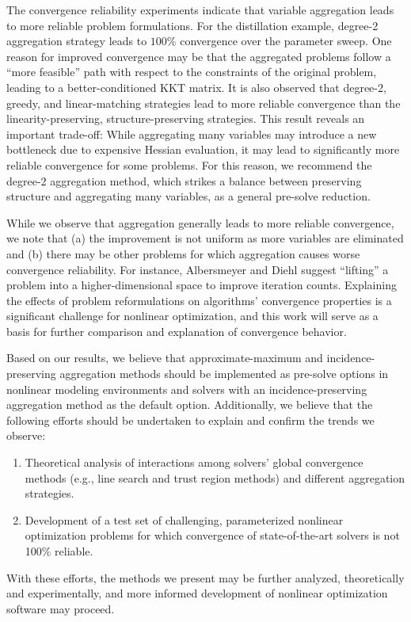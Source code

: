 \documentclass[smallextended]{svjour3}
\newcommand{\rev}[1]{{#1}}
\begin{document}
The convergence reliability experiments indicate that variable aggregation leads to more
reliable problem formulations. For the distillation example, degree-2 aggregation
strategy leads to $100 \%$ convergence over the parameter sweep.
One reason for improved convergence may be that the aggregated problems follow a ``more
feasible'' path with respect to the constraints of the original problem,
leading to a better-conditioned KKT matrix.
It is also observed that degree-2, greedy, and linear-matching strategies lead
to more reliable convergence than the linearity-preserving, structure-preserving
strategies.
This result reveals an important trade-off: While aggregating many variables may
introduce a new bottleneck due to expensive Hessian evaluation, it may lead to
significantly more reliable convergence for some problems. For this reason,
we recommend the degree-2 aggregation method, which strikes a balance between
preserving structure and aggregating many variables, as a general pre-solve reduction.

While we observe that aggregation generally leads to more reliable convergence, we note
that (a) the improvement is not uniform as more variables are eliminated and (b) there
may be other problems for which aggregation causes worse convergence reliability.
For instance, Albersmeyer and Diehl \cite{albersmeyer2010lifted} suggest ``lifting''
a problem into a higher-dimensional space to improve iteration counts.
Explaining the effects of problem reformulations on algorithms' convergence properties
is a significant challenge for nonlinear optimization, and this work will serve as a basis
for further comparison and explanation of convergence behavior.

Based on our results, we believe that approximate-maximum and incidence-preserving
aggregation methods should be implemented as pre-solve options in nonlinear modeling
environments and solvers \rev{with an incidence-preserving aggregation method as the default option}.
Additionally, we believe that the following efforts should
be undertaken to explain and confirm the trends we observe:
\begin{enumerate}
  \item Theoretical analysis of interactions among solvers' \rev{global convergence} methods
    \rev{(e.g., line search and trust region methods)} and
    different aggregation strategies.
  \item Development of a test set of challenging, parameterized nonlinear optimization
    problems for which convergence of state-of-the-art solvers is not 100\% reliable.
\end{enumerate}
With these efforts, the methods we present may be further analyzed, theoretically and
experimentally, and more informed development of nonlinear optimization software
may proceed.
\end{document}
